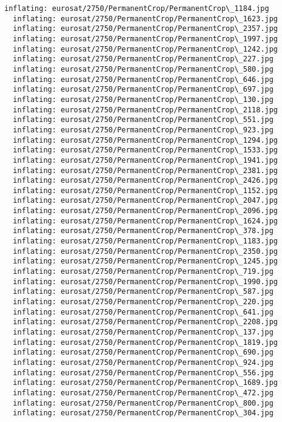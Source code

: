 \documentclass[11pt]{article}
\begin{document}
\begin{Verbatim}[commandchars=\\\{\}]
  inflating: eurosat/2750/PermanentCrop/PermanentCrop\_1184.jpg
  inflating: eurosat/2750/PermanentCrop/PermanentCrop\_1623.jpg
  inflating: eurosat/2750/PermanentCrop/PermanentCrop\_2357.jpg
  inflating: eurosat/2750/PermanentCrop/PermanentCrop\_1997.jpg
  inflating: eurosat/2750/PermanentCrop/PermanentCrop\_1242.jpg
  inflating: eurosat/2750/PermanentCrop/PermanentCrop\_227.jpg
  inflating: eurosat/2750/PermanentCrop/PermanentCrop\_580.jpg
  inflating: eurosat/2750/PermanentCrop/PermanentCrop\_646.jpg
  inflating: eurosat/2750/PermanentCrop/PermanentCrop\_697.jpg
  inflating: eurosat/2750/PermanentCrop/PermanentCrop\_130.jpg
  inflating: eurosat/2750/PermanentCrop/PermanentCrop\_2118.jpg
  inflating: eurosat/2750/PermanentCrop/PermanentCrop\_551.jpg
  inflating: eurosat/2750/PermanentCrop/PermanentCrop\_923.jpg
  inflating: eurosat/2750/PermanentCrop/PermanentCrop\_1294.jpg
  inflating: eurosat/2750/PermanentCrop/PermanentCrop\_1533.jpg
  inflating: eurosat/2750/PermanentCrop/PermanentCrop\_1941.jpg
  inflating: eurosat/2750/PermanentCrop/PermanentCrop\_2381.jpg
  inflating: eurosat/2750/PermanentCrop/PermanentCrop\_2426.jpg
  inflating: eurosat/2750/PermanentCrop/PermanentCrop\_1152.jpg
  inflating: eurosat/2750/PermanentCrop/PermanentCrop\_2047.jpg
  inflating: eurosat/2750/PermanentCrop/PermanentCrop\_2096.jpg
  inflating: eurosat/2750/PermanentCrop/PermanentCrop\_1624.jpg
  inflating: eurosat/2750/PermanentCrop/PermanentCrop\_378.jpg
  inflating: eurosat/2750/PermanentCrop/PermanentCrop\_1183.jpg
  inflating: eurosat/2750/PermanentCrop/PermanentCrop\_2350.jpg
  inflating: eurosat/2750/PermanentCrop/PermanentCrop\_1245.jpg
  inflating: eurosat/2750/PermanentCrop/PermanentCrop\_719.jpg
  inflating: eurosat/2750/PermanentCrop/PermanentCrop\_1990.jpg
  inflating: eurosat/2750/PermanentCrop/PermanentCrop\_587.jpg
  inflating: eurosat/2750/PermanentCrop/PermanentCrop\_220.jpg
  inflating: eurosat/2750/PermanentCrop/PermanentCrop\_641.jpg
  inflating: eurosat/2750/PermanentCrop/PermanentCrop\_2208.jpg
  inflating: eurosat/2750/PermanentCrop/PermanentCrop\_137.jpg
  inflating: eurosat/2750/PermanentCrop/PermanentCrop\_1819.jpg
  inflating: eurosat/2750/PermanentCrop/PermanentCrop\_690.jpg
  inflating: eurosat/2750/PermanentCrop/PermanentCrop\_924.jpg
  inflating: eurosat/2750/PermanentCrop/PermanentCrop\_556.jpg
  inflating: eurosat/2750/PermanentCrop/PermanentCrop\_1689.jpg
  inflating: eurosat/2750/PermanentCrop/PermanentCrop\_472.jpg
  inflating: eurosat/2750/PermanentCrop/PermanentCrop\_800.jpg
  inflating: eurosat/2750/PermanentCrop/PermanentCrop\_304.jpg

\end{Verbatim}
\end{document}
